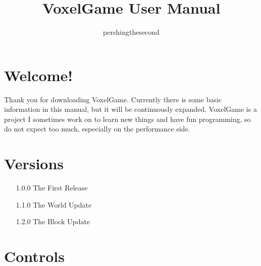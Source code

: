 \documentclass{article}
\begin{document}
    \title{VoxelGame User Manual}
    \author{pershingthesecond}

    \maketitle
    \newpage

    \tableofcontents
    \newpage


    \section{Welcome!}\label{sec:welcome!}

    Thank you for downloading VoxelGame.
    Currently there is some basic information in this manual, but it will be continuously expanded.
    VoxelGame is a project I sometimes work on to learn new things and have fun programming, so do not expect too much, especially on the performance side.


    \section{Versions}\label{sec:versions}

    \begin{enumerate}
        \item[1.0.0] The First Release
        \item[1.1.0] The World Update
        \item[1.2.0] The Block Update
    \end{enumerate}


    \section{Controls}\label{sec:controls}

    
\end{document}
